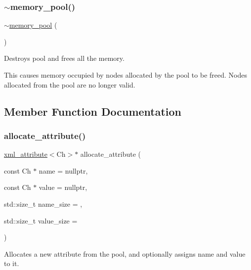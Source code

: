 \subsubsection{\texorpdfstring{$\sim$memory\+\_\+pool()}{~memory\_pool()}}
{\footnotesize\ttfamily $\sim$\mbox{\hyperlink{classrapidxml_1_1memory__pool}{memory\+\_\+pool}} (\begin{DoxyParamCaption}{ }\end{DoxyParamCaption})\hspace{0.3cm}{\ttfamily [inline]}}



Destroys pool and frees all the memory. 

This causes memory occupied by nodes allocated by the pool to be freed. Nodes allocated from the pool are no longer valid. 

\subsection{Member Function Documentation}
\mbox{\label{classrapidxml_1_1memory__pool_aa7286aec00dac6d9af11cdc69e1e470e}} 
\subsubsection{\texorpdfstring{allocate\+\_\+attribute()}{allocate\_attribute()}}
{\footnotesize\ttfamily \mbox{\hyperlink{classrapidxml_1_1xml__attribute}{xml\+\_\+attribute}}$<$Ch$>$$\ast$ allocate\+\_\+attribute (\begin{DoxyParamCaption}\item[{const Ch $\ast$}]{name = {\ttfamily nullptr},  }\item[{const Ch $\ast$}]{value = {\ttfamily nullptr},  }\item[{std\+::size\+\_\+t}]{name\+\_\+size = {},  }\item[{std\+::size\+\_\+t}]{value\+\_\+size = {} }\end{DoxyParamCaption})\hspace{0.3cm}{\ttfamily [inline]}}



Allocates a new attribute from the pool, and optionally assigns name and value to it. 

